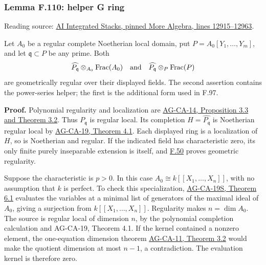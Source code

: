 \documentclass[11pt,a4paper,openany]{report}
\begin{document}
\label{AG-RG-S05-more-algebra-lemma-helper-G-ring}

\subsubsection{Lemma F.110: helper G ring}\label{AG-RG-S05-lemma-f.110-helper-g-ring}

Reading source: \href{https://github.com/KokunoYumeto/unofficial-stacks-project-ai-drafts/blob/565b10e987aba5969b21145a0833f42d69f96790/more-algebra.tex\#L12915-L12963}{AI Integrated Stacks, pinned More Algebra, lines 12915--12963}.

Let \(A_0\) be a regular complete Noetherian local domain, put \(P=A_0[Y_1,\ldots,Y_m]\), and let \(\mathfrak q\subset P\) be any prime. Both \[\widehat{P_{\mathfrak q}}\otimes_{A_0}\operatorname{Frac}(A_0)
\quad\hbox{and}\quad
\widehat{P_{\mathfrak q}}\otimes_P\operatorname{Frac}(P)\] are geometrically regular over their displayed fields. The second assertion contains the power-series helper; the first is the additional form used in F.97.

\textbf{Proof.} Polynomial regularity and localization are \href{https://github.com/KokunoYumeto/open-math-courses/blob/d02d0a3669f42579db037cd44de1d113fdd770a1/docs/courses/AG-CA/src/regular-local-rings.md}{AG-CA-14, Proposition 3.3 and Theorem 3.2}. Thus \(P_{\mathfrak q}\) is regular local. Its completion \(H=\widehat{P_{\mathfrak q}}\) is Noetherian regular local by \href{https://github.com/KokunoYumeto/open-math-courses/blob/d02d0a3669f42579db037cd44de1d113fdd770a1/docs/courses/AG-CA/src/completion.md}{AG-CA-19, Theorem 4.1}. Each displayed ring is a localization of \(H\), so is Noetherian and regular. If the indicated field has characteristic zero, its only finite purely inseparable extension is itself, and \hyperref[AG-RG-S05-algebra-lemma-geometrically-regular]{F.50} proves geometric regularity.

Suppose the characteristic is \(p>0\). In this case \(A_0\cong k[[X_1,\ldots,X_n]]\), with no assumption that \(k\) is perfect. To check this specialization, \href{https://github.com/KokunoYumeto/open-math-courses/blob/d02d0a3669f42579db037cd44de1d113fdd770a1/docs/courses/AG-CA/src/coefficient-rings-and-cohen-structure.md}{AG-CA-19S, Theorem 6.1} evaluates the variables at a minimal list of generators of the maximal ideal of \(A_0\), giving a surjection from \(k[[X_1,\ldots,X_n]]\). Regularity makes \(n=\dim A_0\). The source is regular local of dimension \(n\), by the polynomial completion calculation and AG-CA-19, Theorem 4.1. If the kernel contained a nonzero element, the one-equation dimension theorem \href{https://github.com/KokunoYumeto/open-math-courses/blob/d02d0a3669f42579db037cd44de1d113fdd770a1/docs/courses/AG-CA/src/dimension-theory-of-noetherian-local-rings.md}{AG-CA-11, Theorem 3.2} would make the quotient dimension at most \(n-1\), a contradiction. The evaluation kernel is therefore zero.
\end{document}
